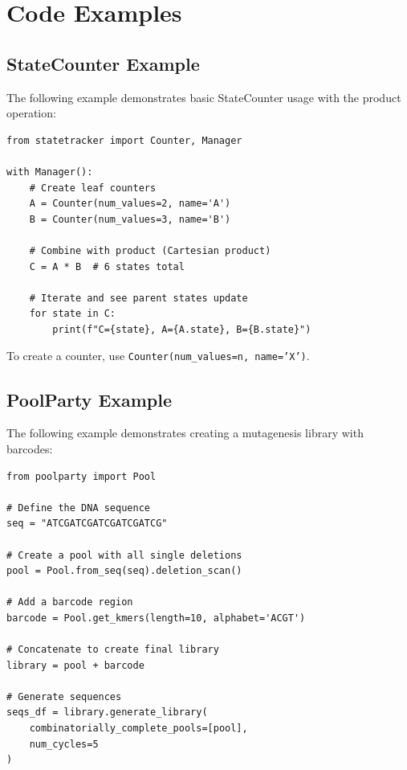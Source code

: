 \documentclass[11pt]{article}
\begin{document}
\section{Code Examples}
\label{sec:code-examples}


\subsection{StateCounter Example}
\label{subsec:statecounter-example}

The following example demonstrates basic StateCounter usage with the product operation:

\begin{verbatim}
from statetracker import Counter, Manager

with Manager():
    # Create leaf counters
    A = Counter(num_values=2, name='A')
    B = Counter(num_values=3, name='B')
    
    # Combine with product (Cartesian product)
    C = A * B  # 6 states total
    
    # Iterate and see parent states update
    for state in C:
        print(f"C={state}, A={A.state}, B={B.state}")
\end{verbatim}

To create a counter, use \texttt{Counter(num_values=n, name='X')}.


\subsection{PoolParty Example}
\label{subsec:poolparty-example}

The following example demonstrates creating a mutagenesis library with barcodes:

\begin{verbatim}
from poolparty import Pool

# Define the DNA sequence
seq = "ATCGATCGATCGATCGATCG"

# Create a pool with all single deletions
pool = Pool.from_seq(seq).deletion_scan()

# Add a barcode region
barcode = Pool.get_kmers(length=10, alphabet='ACGT')

# Concatenate to create final library
library = pool + barcode

# Generate sequences
seqs_df = library.generate_library(
    combinatorially_complete_pools=[pool],
    num_cycles=5
)
\end{verbatim}
\end{document}
